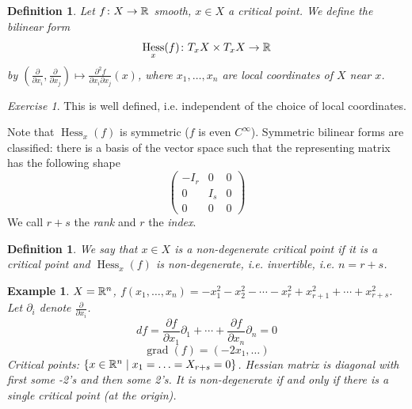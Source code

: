 \documentclass[A4paper, british, reqno]{amsart}
\theoremstyle{darkgreentheorem}
\theoremstyle{darkbluedefinition}
\newtheorem{defn}[thm]{Definition}
\theoremstyle{darkredexample}
\newtheorem{exa}[thm]{Example}
\theoremstyle{remark}
\newtheorem{exe}[thm]{Exercise}
\DeclareMathOperator{\Hess}{Hess}
\newcommand{\1}{\mathbbm{1}}
\newcommand{\tms}{\times}
\begin{document}
\begin{defn}
    Let $f\colon X\to \mathbb{R}$ smooth, $x\in X$ a critical point.
    We define the bilinear form
    \[ \Hess_{x}(f)\colon T_{x}X\tms T_{x}X\to \R \]
    by $\left(\frac{\partial}{\partial x_{i}},\frac{\partial}{\partial x_{j}}\right)\mapsto \frac{\partial^{2} f}{\partial x_{i}\partial x_{j}}(x) $, where $x_{1},\ldots,x_{n}$ are local coordinates of $X$ near $x$.
\end{defn}

\begin{exe}
    This is well defined, i.e. independent of the choice of local coordinates.
\end{exe}

Note that $\Hess_{x}(f)$ is symmetric ($f$ is even $C^{\infty}$).
Symmetric bilinear forms are classified: there is a basis of the vector space such that the representing matrix has the following shape
\[ \begin{pmatrix} -I_{r} & 0 & 0 \\ 0 & I_{s} & 0 \\ 0 & 0 & 0\end{pmatrix} \]
We call $r+s$ the \textit{rank} and $r$ the \textit{index}.

\begin{defn}
    We say that $x\in X$ is a \textit{non-degenerate} critical point if it is a critical point and $\Hess_{x}(f)$ is non-degenerate, i.e. invertible, i.e. $n=r+s$.
\end{defn}

\begin{exa}
    $X=\mathbb{R}^{n}$, $f(x_{1},\ldots,x_{n})=-x_{1}^{2}-x_{2}^{2}-\cdots -x_{r}^{2} + x_{r+1}^{2}+\cdots +x_{r+s}^{2}$.
    Let $\partial_{i}$ denote $\frac{\partial}{\partial x_{i}}$.
    \[ df=\frac{\partial f}{\partial x_{1}}\partial_{1}+\cdots +\frac{\partial f}{\partial x_{n}}\partial_{n}=0 \]
    \[ \operatorname{grad}(f)=(-2x_{1},\ldots) \]
    Critical points: $\{ x\in \mathbb{R}^{n}\mid x_{1}=\ldots=X_{r+s}=0\}$.
    Hessian matrix is diagonal with first some -2's and then some 2's.
    It is non-degenerate if and only if there is a single critical point (at the origin).
\end{exa}
\end{document}
